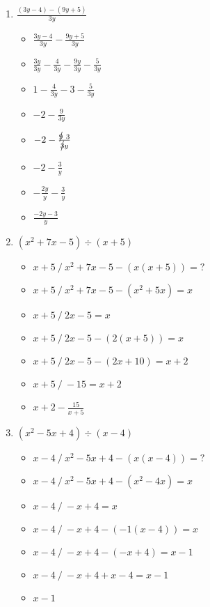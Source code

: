 \documentclass{article}
\begin{document}
\begin{onehalfspace}
\begin{enumerate}
    \item $\frac{(3y - 4) - (9y + 5)}{3y}$
    \begin{itemize}
        \item $\frac{3y - 4}{3y} - \frac{9y + 5}{3y}$
        \item $\frac{3y}{3y} - \frac{4}{3y} - \frac{9y}{3y} - \frac{5}{3y}$
        \item $1 - \frac{4}{3y} - 3 - \frac{5}{3y}$
        \item $- 2 - \frac{9}{3y}$
        \item $- 2 - \frac{\cancel{9}\ 3}{\cancel{3}y}$
        \item $- 2 - \frac{3}{y}$
        \item $- \frac{2y}{y} - \frac{3}{y}$
        \item $\frac{-2y - 3}{y}$
    \end{itemize}
    
    \item $(x^{2} + 7x - 5) \div (x + 5)$
    \begin{itemize}
        \item $x + 5 \ / \ x^{2} + 7x - 5 - (x(x + 5)) = ?$
        \item $x + 5 \ / \ x^{2} + 7x - 5 - (x^{2} + 5x) = x$
        \item $x + 5 \ / \ 2x - 5 = x$
        \item $x + 5 \ / \ 2x - 5  - (2(x + 5))= x$
        \item $x + 5 \ / \ 2x - 5  - (2x + 10)= x + 2$
        \item $x + 5 \ / \ - 15 = x + 2$
        \item $x + 2 - \frac{15}{x + 5}$
    \end{itemize}

    \item $(x^{2} - 5x + 4) \div (x - 4)$
    \begin{itemize}
        \item $x - 4 \ / \ x^{2} - 5x + 4 - (x(x - 4)) = ? $
        \item $x - 4 \ / \ x^{2} - 5x + 4 - (x^{2} - 4x) = x $
        \item $x - 4 \ / \ - x + 4 = x $
        \item $x - 4 \ / \ - x + 4 - (-1(x - 4)) = x $
        \item $x - 4 \ / \ - x + 4 - (-x + 4) = x - 1$
        \item $x - 4 \ / \ - x + 4 + x - 4 = x - 1$
        \item $x - 1$
    \end{itemize}
    

\end{enumerate}
\end{onehalfspace}
\end{document}
